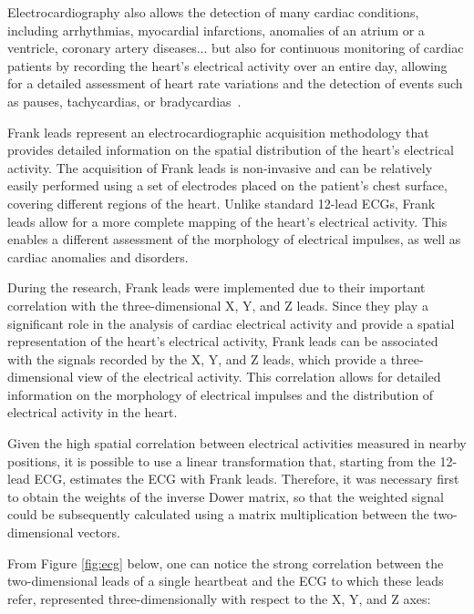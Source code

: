\documentclass[12pt,english]{report}
\begin{document}
Electrocardiography also allows the detection of many cardiac conditions, including arrhythmias, myocardial infarctions, anomalies of an atrium or a ventricle, coronary artery diseases... but also for continuous monitoring of cardiac patients by recording the heart's electrical activity over an entire day, allowing for a detailed assessment of heart rate variations and the detection of events such as pauses, tachycardias, or bradycardias~\cite{classification}.

Frank leads represent an electrocardiographic acquisition methodology that provides detailed information on the spatial distribution of the heart's electrical activity. The acquisition of Frank leads is non-invasive and can be relatively easily performed using a set of electrodes placed on the patient's chest surface, covering different regions of the heart. Unlike standard 12-lead ECGs, Frank leads allow for a more complete mapping of the heart's electrical activity. This enables a different assessment of the morphology of electrical impulses, as well as cardiac anomalies and disorders.

During the research, Frank leads were implemented due to their important correlation with the three-dimensional X, Y, and Z leads. Since they play a significant role in the analysis of cardiac electrical activity and provide a spatial representation of the heart's electrical activity, Frank leads can be associated with the signals recorded by the X, Y, and Z leads, which provide a three-dimensional view of the electrical activity. This correlation allows for detailed information on the morphology of electrical impulses and the distribution of electrical activity in the heart.

Given the high spatial correlation between electrical activities measured in nearby positions, it is possible to use a linear transformation that, starting from the 12-lead ECG, estimates the ECG with Frank leads. Therefore, it was necessary first to obtain the weights of the inverse Dower matrix, so that the weighted signal could be subsequently calculated using a matrix multiplication between the two-dimensional vectors.

From Figure \ref{fig:ecg} below, one can notice the strong correlation between the two-dimensional leads of a single heartbeat and the ECG to which these leads refer, represented three-dimensionally with respect to the X, Y, and Z axes:
\end{document}
